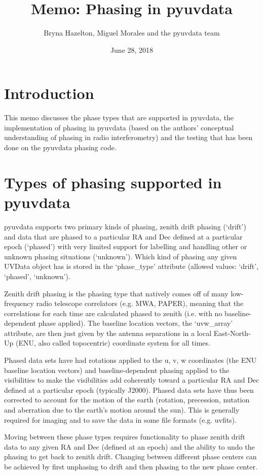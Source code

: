 \documentclass[11pt, oneside]{article}   	%
\title{Memo: Phasing in pyuvdata}
\author{Bryna Hazelton, Miguel Morales and the pyuvdata team}
\date{June 28, 2018}							%
\begin{document}
\maketitle
\section{Introduction}
This memo discusses the phase types that are supported in pyuvdata, the implementation of phasing in pyuvdata (based on the authors' conceptual understanding of phasing in radio interferometry) and the testing that has been done on the pyuvdata phasing code.

\section{Types of phasing supported in pyuvdata}
pyuvdata supports two primary kinds of phasing, zenith drift phasing (`drift') and data that are phased to a particular RA and Dec defined at a particular epoch (`phased') with very limited support for labelling and handling other or unknown phasing situations (`unknown'). Which kind of phasing any given UVData object has is stored in the `phase\_type' attribute (allowed values: `drift', `phased', `unknown').

Zenith drift phasing is the phasing type that natively comes off of many low-frequency radio telescope correlators (e.g. MWA, PAPER), meaning that the correlations for each time are calculated phased to zenith (i.e. with no baseline-dependent phase applied). The baseline location vectors, the `uvw\_array' attribute, are then just given by the antenna separations in a local East-North-Up (ENU, also called topocentric) coordinate system for all times.

Phased data sets have had rotations applied to the u, v, w coordinates (the ENU baseline location vectors) and baseline-dependent phasing applied to the visibilities to make the visibilities add coherently toward a particular RA and Dec defined at a particular epoch (typically J2000). Phased data sets have thus been corrected to account for the motion of the earth (rotation, precession, nutation and aberration due to the earth's motion around the sun). This is generally required for imaging and to save the data in some file formats (e.g. uvfits).

Moving between these phase types requires functionality to phase zenith drift data to any given RA and Dec (defined at an epoch) and the ability to undo the phasing to get back to zenith drift. Changing between different phase centers can be achieved by first unphasing to drift and then phasing to the new phase center.
\end{document}
